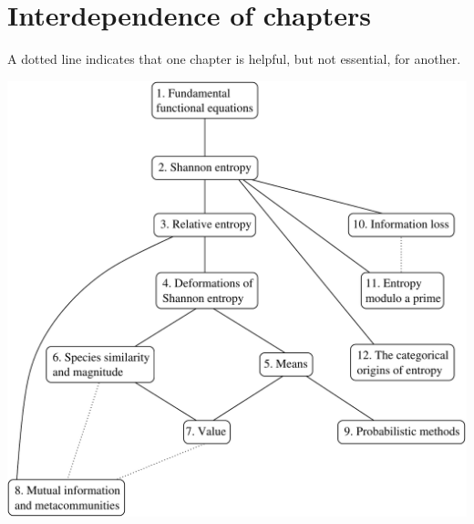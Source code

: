 \chapter*{Interdependence of chapters}

A dotted line indicates that one chapter is helpful, but not essential, for
another. 

\vspace*{10mm}

\begin{center}
\includegraphics[width=1\textwidth]{dependency5}%
\end{center}

